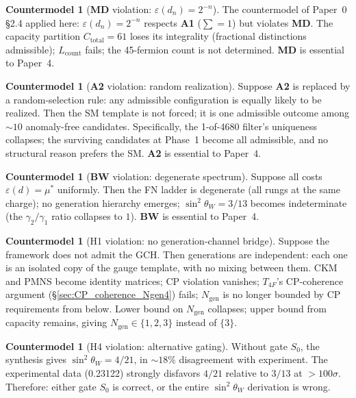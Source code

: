 \documentclass[11pt]{article}
\newcommand{\Aone}{\textbf{A1}}
\newcommand{\Atwo}{\textbf{A2}}
\newcommand{\MD}{\textbf{MD}}
\newcommand{\BW}{\textbf{BW}}
\theoremstyle{definition}
\newtheorem{countermodel}[theorem]{Countermodel}
\begin{document}
\begin{countermodel}[\MD{} violation: $\varepsilon(d_n) = 2^{-n}$]\label{cm:MD_fail}
The countermodel of Paper~0 \S2.4 applied here: $\varepsilon(d_n) = 2^{-n}$ respects \Aone{} ($\sum = 1$) but violates \MD{}. The capacity partition $C_{\mathrm{total}} = 61$ loses its integrality (fractional distinctions admissible); $L_{\mathrm{count}}$ fails; the 45-fermion count is not determined. \MD{} is essential to Paper~4.
\end{countermodel}

\begin{countermodel}[\Atwo{} violation: random realization]\label{cm:A2_fail}
Suppose \Atwo{} is replaced by a random-selection rule: any admissible configuration is equally likely to be realized. Then the SM template is not forced; it is one admissible outcome among $\sim 10$ anomaly-free candidates. Specifically, the 1-of-4680 filter's uniqueness collapses; the surviving candidates at Phase~1 become all admissible, and no structural reason prefers the SM. \Atwo{} is essential to Paper~4.
\end{countermodel}

\begin{countermodel}[\BW{} violation: degenerate spectrum]\label{cm:BW_fail}
Suppose all costs $\varepsilon(d) = \mu^*$ uniformly. Then the FN ladder is degenerate (all rungs at the same charge); no generation hierarchy emerges; $\sin^2\theta_W = 3/13$ becomes indeterminate (the $\gamma_2/\gamma_1$ ratio collapses to $1$). \BW{} is essential to Paper~4.
\end{countermodel}

\begin{countermodel}[H1 violation: no generation-channel bridge]\label{cm:GCH_fail}
Suppose the framework does not admit the GCH. Then generations are independent: each one is an isolated copy of the gauge template, with no mixing between them. CKM and PMNS become identity matrices; CP violation vanishes; $T_{4F}$'s CP-coherence argument (\S\ref{sec:CP_coherence_Ngen4}) fails; $N_{\mathrm{gen}}$ is no longer bounded by CP requirements from below. Lower bound on $N_{\mathrm{gen}}$ collapses; upper bound from capacity remains, giving $N_{\mathrm{gen}} \in \{1, 2, 3\}$ instead of $\{3\}$.
\end{countermodel}

\begin{countermodel}[H4 violation: alternative gating]\label{cm:S0_fail}
Without gate $S_0$, the synthesis gives $\sin^2\theta_W = 4/21$, in $\sim 18\%$ disagreement with experiment. The experimental data (0.23122) strongly disfavors $4/21$ relative to $3/13$ at $>100\sigma$. Therefore: either gate $S_0$ is correct, or the entire $\sin^2\theta_W$ derivation is wrong.
\end{countermodel}
\end{document}
